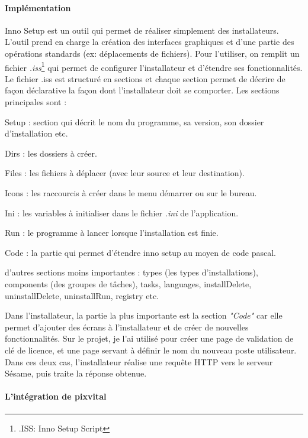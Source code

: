 \paragraph*{Implémentation\\}
Inno Setup est un outil qui permet de réaliser simplement des installateurs. L'outil prend en charge la création des interfaces graphiques et d'une partie des opérations standards (ex: déplacements de fichiers). Pour l'utiliser, on remplit un fichier \textit{.iss}\footnote{.ISS: Inno Setup Script} qui permet de configurer l'installateur et d'étendre ses fonctionnalités. Le fichier .iss est structuré en sections et chaque section permet de décrire de façon déclarative la façon dont l'installateur doit se comporter. Les sections principales sont : 
\begin{sitemize}
\item Setup : section qui décrit le nom du programme, sa version, son dossier d'installation etc.
\item Dirs : les dossiers à créer.
\item Files : les fichiers à déplacer (avec leur source et leur destination).
\item Icons : les raccourcis à créer dans le menu démarrer ou sur le bureau.
\item Ini : les variables à initialiser dans le fichier \textit{.ini} de l'application.
\item Run : le programme à lancer lorsque l'installation est finie.
\item Code : la partie qui permet d'étendre inno setup au moyen de code pascal.
\item d'autres sections moins importantes : types (les types d'installations), components (des groupes de tâches), tasks, languages, installDelete, uninstallDelete, uninstallRun, registry etc.
\end{sitemize}  

Dans l'installateur, la partie la plus importante est la section \textit{"Code"} car elle permet d'ajouter des écrans à l'installateur et de créer de nouvelles fonctionnalités. Sur le projet, je l'ai utilisé pour créer une page de validation de clé de licence, et une page servant à définir le nom du nouveau poste utilisateur.\\
Dans ces deux cas, l'installateur réalise une requête HTTP vers le serveur Sésame, puis traite la réponse obtenue. 

\paragraph*{L'intégration de pixvital\\}

